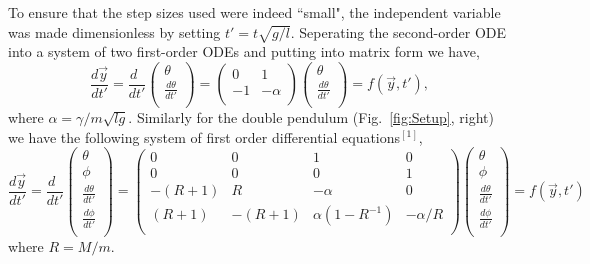 \documentclass[10pt,a4paper]{article}
\begin{document}
To ensure that the step sizes used were indeed ``small", the independent variable was made dimensionless by setting $t' = t\sqrt{g/l}$. Seperating the second-order ODE into a system of two first-order ODEs and putting into matrix form we have,
\begin{equation}
 \frac{d\vec{y}}{dt'}      
=
 \frac{d\phantom{0}}{dt'}      
     \begin{pmatrix}
       \theta        \\[0.1em]
        \frac{d\theta}{dt'}              \\[0.1em]
     \end{pmatrix}
= 
     \begin{pmatrix}
       0 & 1        \\[0.2em]
       -1 & -\alpha        \\[0.2em]
     \end{pmatrix}
     \begin{pmatrix}
       \theta        \\[0.1em]
        \frac{d\theta}{dt'}              \\[0.1em]
     \end{pmatrix} = f(\vec{y}, t'),
\end{equation}
where $\alpha =  \gamma/m\sqrt{lg} $.
Similarly for the double pendulum  (Fig.~\ref{fig:Setup}, right) we have the following system of first order differential equations$^{[1]}$,
\begin{equation}
 \frac{d\vec{y}}{dt'}      
=
 \frac{d\phantom{0}}{dt'}      
     \begin{pmatrix}
       \theta        \\[0.1em]
       \phi        \\[0.1em]
        \frac{d\theta}{dt'}  \\[0.1em]
         \frac{d\phi}{dt'} \\[0.1em]
     \end{pmatrix}
= 
     \begin{pmatrix}
       0 & 0 & 1 & 0     \\[0.2em]
       0 & 0 & 0 & 1     \\[0.2em]
       -(R+1) & R & -\alpha & 0 \\[0.2em]
       (R+1) & -(R+1) &  \alpha(1-R^{-1})& -\alpha/R       \\[0.2em]
     \end{pmatrix}
     \begin{pmatrix}
       \theta        \\[0.1em]
       \phi        \\[0.1em]
        \frac{d\theta}{dt'}  \\[0.1em]
         \frac{d\phi}{dt'} \\[0.1em]
     \end{pmatrix} = f(\vec{y}, t')
\end{equation}
where $R=M/m$.
\end{document}
